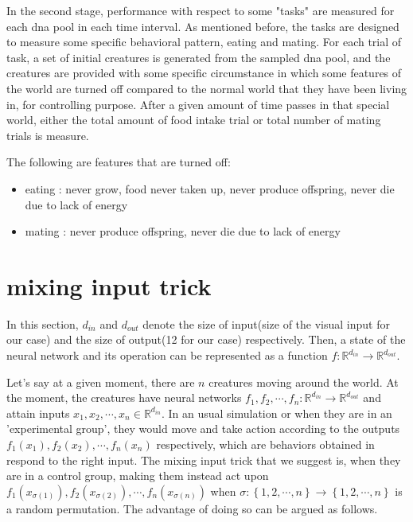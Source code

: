 \documentclass{article}
\numberwithin{equation}{section}
\newcommand{\set}[1]{\left\{#1\right\}}
\begin{document}
In the second stage, performance with respect to some "tasks" are measured for each dna pool in each time interval. As mentioned before, the tasks are designed to measure some specific behavioral pattern, eating and mating. For each trial of task, a set of initial creatures is generated from the sampled dna pool, and the creatures are provided with some specific circumstance in which some features of the world are turned off compared to the normal world that they have been living in, for controlling purpose. After a given amount of time passes in that special world, either the total amount of food intake trial or total number of mating trials is measure.

The following are features that are turned off:

\begin{itemize}
\item 
eating : never grow, food never taken up, never produce offspring, never die due to lack of energy 

\item
mating : never produce offspring, never die due to lack of energy 
\end{itemize}

\section{mixing input trick}
In this section, $d_{in}$ and $d_{out}$ denote the size of input(size of the visual input for our case) and the size of output(12 for our case) respectively. Then, a state of the neural network and its operation can be represented as a function $f:\mathbb{R}^{d_{in}}\to\mathbb{R}^{d_{out}}$.  

Let's say at a given moment, there are $n$ creatures moving around the world. At the moment, the creatures have neural networks $f_1,f_2,\cdots,f_n:\mathbb{R}^{d_{in}}\to\mathbb{R}^{d_{out}}$ and attain inputs $x_1,x_2,\cdots,x_n\in\mathbb{R}^{d_{in}}$. In an usual simulation or when they are in an 'experimental group', they would move and take action according to the outputs $f_1(x_1),f_2(x_2),\cdots,f_n(x_n)$ respectively, which are behaviors obtained in respond to the right input. The mixing input trick that we suggest is, when they are in a control group, making them instead act upon $f_1(x_{\sigma(1)}),f_2(x_{\sigma(2)}),\cdots, f_n(x_{\sigma(n)})$ when $\sigma:\set{1,2,\cdots,n}\to\set{1,2,\cdots,n}$ is a random permutation. The advantage of doing so can be argued as follows. 
\end{document}
